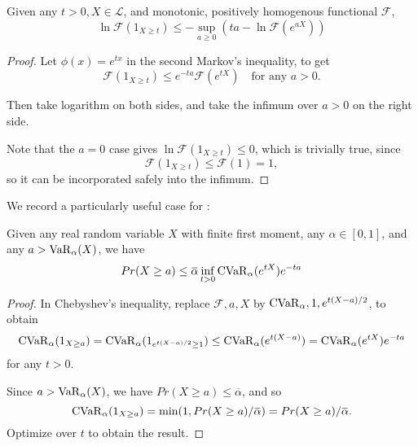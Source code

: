 \begin{prop}
Given any $t > 0, X\in\mathscr{L}$, and monotonic, positively homogenous functional $\mathcal{F}$,
\begin{equation}
\label{eq:chernoff}
\ln\mathcal{F}(1_{X\ge t}) \le -\sup_{a \ge 0}(ta - \ln\mathcal{F}(e^{aX}))
\end{equation}
\end{prop}
\begin{proof}
Let $\phi(x) = e^{tx}$ in the second Markov's inequality, to get 
$$\mathcal{F}(1_{X\ge t}) \le e^{-ta}\mathcal{F}(e^{tX})\quad \text{for any } a > 0.$$

Then take logarithm on both sides, and take the infimum over $a > 0$ on the right side. 

Note that the $a = 0$ case gives $\ln\mathcal{F}(1_{X\ge t}) \le 0$, which is trivially true, since 
$$\mathcal{F}(1_{X\ge t}) \le \mathcal{F}(1) = 1,$$
so it can be incorporated safely into the infimum.
\end{proof}

We record a particularly useful case for \cvar:

\begin{cor}
	\label{thm:chernoff_cvar}
	Given any real random variable $X$ with finite first moment, any $\alpha \in [0, 1]$, and any $a > \operatorname{VaR}_\alpha(X)$, we have 
	\begin{equation}
	\label{eq:chernoff_cvar}
		Pr(X \ge a) \le {\overbar{\alpha}} \inf_{t > 0} \cvar_\alpha(e^{tX}) e^{-ta}
	\end{equation}
\end{cor}
\begin{proof}
	In Chebyshev's inequality, replace $\mathcal{F}, a, X$ by $\operatorname{CVaR}_\alpha, 1, e^{t(X - a)/2}$, to obtain
	$$\operatorname{CVaR}_\alpha(1_{X \ge a}) = \operatorname{CVaR}_\alpha(1_{e^{t(X-a)/2} \ge 1}) \le \operatorname{CVaR}_\alpha(e^{t(X-a)}) = \operatorname{CVaR}_\alpha(e^{tX}) e^{-ta}$$
	for any $ t> 0$.
	
	Since $a > \operatorname{VaR}_\alpha(X)$, we have $Pr(X \ge a) \le {\overbar{\alpha}}$, and so
	$$\cvar_\alpha(1_{X \ge a}) = \min(1, Pr(X \ge a)/{\overbar{\alpha}}) = Pr(X \ge a)/{\overbar{\alpha}}.$$
	Optimize over $t$ to obtain the result.
\end{proof}

